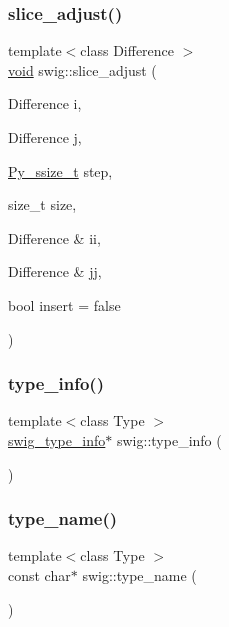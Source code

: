 \subsubsection{\texorpdfstring{slice\+\_\+adjust()}{slice\_adjust()}}
{\footnotesize\ttfamily template$<$class Difference $>$ \\
\hyperlink{lp__lib_8h_ac7828c7b2b31d2e11af17bdb6289c5d9}{void} swig\+::slice\+\_\+adjust (\begin{DoxyParamCaption}\item[{Difference}]{i,  }\item[{Difference}]{j,  }\item[{\hyperlink{libstructural__wrap__python_8cpp_a47424a8953c340f500027db7e6c00173}{Py\+\_\+ssize\+\_\+t}}]{step,  }\item[{size\+\_\+t}]{size,  }\item[{Difference \&}]{ii,  }\item[{Difference \&}]{jj,  }\item[{bool}]{insert = {\ttfamily false} }\end{DoxyParamCaption})}

\mbox{\label{namespaceswig_a9c6f187a18af145322c3a3d6faad4ec5}} 
\subsubsection{\texorpdfstring{type\+\_\+info()}{type\_info()}}
{\footnotesize\ttfamily template$<$class Type $>$ \\
\hyperlink{structswig__type__info}{swig\+\_\+type\+\_\+info}$\ast$ swig\+::type\+\_\+info (\begin{DoxyParamCaption}{ }\end{DoxyParamCaption})\hspace{0.3cm}{\ttfamily [inline]}}

\mbox{\label{namespaceswig_ae90796b330cfb3adb7d76612cab3ede9}} 
\subsubsection{\texorpdfstring{type\+\_\+name()}{type\_name()}}
{\footnotesize\ttfamily template$<$class Type $>$ \\
const char$\ast$ swig\+::type\+\_\+name (\begin{DoxyParamCaption}{ }\end{DoxyParamCaption})\hspace{0.3cm}{\ttfamily [inline]}}

